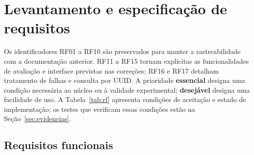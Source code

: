 \section{Levantamento e especificação de requisitos}
\label{sec:requisitos}
Os identificadores RF01 a RF10 são preservados para manter a rastreabilidade com a documentação anterior. RF11 a RF15 tornam explícitas as funcionalidades de avaliação e interface previstas nas correções; RF16 e RF17 detalham tratamento de falhas e consulta por UUID. A prioridade \textbf{essencial} designa uma condição necessária ao núcleo ou à validade experimental; \textbf{desejável} designa uma facilidade de uso. A Tabela~\ref{tab:rf} apresenta condições de aceitação e estado de implementação; os testes que verificam essas condições estão na Seção~\ref{sec:evidencias}.

\subsection{Requisitos funcionais}
